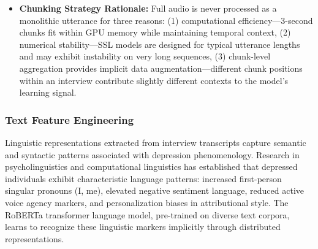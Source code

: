 \documentclass[12pt]{article}
\begin{document}
\begin{itemize}
		\item \textbf{Chunking Strategy Rationale:} Full audio is never processed as a monolithic utterance for three reasons: (1) computational efficiency—3-second chunks fit within GPU memory while maintaining temporal context, (2) numerical stability—SSL models are designed for typical utterance lengths and may exhibit instability on very long sequences, (3) chunk-level aggregation provides implicit data augmentation—different chunk positions within an interview contribute slightly different contexts to the model's learning signal.
	\end{itemize}

	\subsubsection{Text Feature Engineering}

	Linguistic representations extracted from interview transcripts capture semantic and syntactic patterns associated with depression phenomenology. Research in psycholinguistics and computational linguistics has established that depressed individuals exhibit characteristic language patterns: increased first-person singular pronouns (I, me), elevated negative sentiment language, reduced active voice agency markers, and personalization biases in attributional style. The RoBERTa transformer language model, pre-trained on diverse text corpora, learns to recognize these linguistic markers implicitly through distributed representations.
\end{document}
